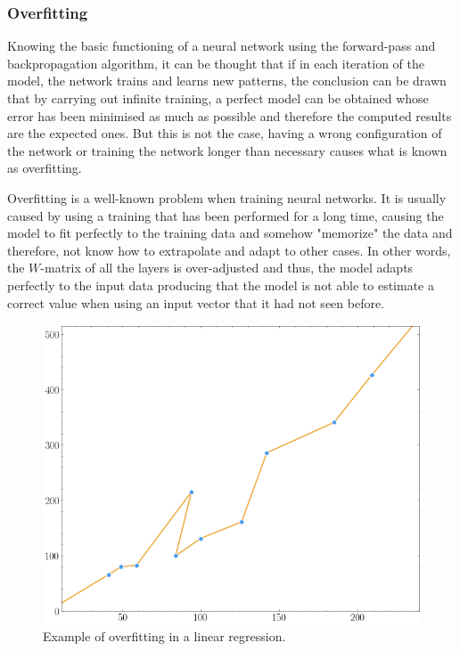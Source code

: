 \subsubsection{Overfitting}\label{overfitting}

Knowing the basic functioning of a neural network using the forward-pass and backpropagation algorithm, it can be thought that if in each iteration of the model, the network trains and learns new patterns, the conclusion can be drawn that by carrying out infinite training, a perfect model can be obtained whose error has been minimised as much as possible and therefore the computed results are the expected ones. But this is not the case, having a wrong configuration of the network or training the network longer than necessary causes what is known as overfitting.
\newline


Overfitting is a well-known problem when training neural networks. It is usually caused by using a training that has been performed for a long time, causing the model to fit perfectly to the training data and somehow "memorize" the data and therefore, not know how to extrapolate and adapt to other cases. In other words, the $W$-matrix of all the layers is over-adjusted and thus, the model adapts perfectly to the input data producing that the model is not able to estimate a correct value when using an input vector that it had not seen before.

\begin{figure}[H]
    \centering
    \includegraphics[width=12cm]{images/state-of-art/overfitting/overfitting.png}
    \caption{Example of overfitting in a linear regression.}
    \label{fig:basic_network}
\end{figure}


